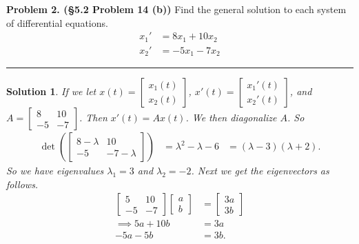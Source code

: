 \documentclass[leqno]{article}
\theoremstyle{nonumberplain}
\newtheorem{solution}{Solution}
\begin{document}


\noindent\textbf{Problem 2. (\S 5.2 Problem 14 (b))} Find the general solution to each system of differential equations.
\begin{align*}
x_1'&=8x_1+10x_2\\
x_2'&=-5x_1-7x_2
\end{align*}

\noindent\rule[0.5ex]{\linewidth}{1pt}

\begin{solution}
If we let $x(t)=\begin{bmatrix} x_1(t) \\ x_2(t) \end{bmatrix}$, $x'(t)=\begin{bmatrix} x_1'(t)\\ x_2'(t) \end{bmatrix}$, and $A=\begin{bmatrix} 8 & 10 \\ -5 & -7 \end{bmatrix}$. Then $x'(t)=Ax(t)$.  We then diagonalize $A$.  So
\begin{align*}
\det\left( \begin{bmatrix}
8-\lambda & 10\\
-5 & -7 - \lambda
\end{bmatrix}\right)&=
\lambda^2-\lambda-6&=(\lambda-3)(\lambda+2).
\end{align*}
So we have eigenvalues $\lambda_1=3$ and $\lambda_2=-2$.  Next we get the eigenvectors as follows.
\begin{align*}
\begin{bmatrix}
5 & 10\\
-5 & -7
\end{bmatrix}
\begin{bmatrix}
a\\
b
\end{bmatrix}
&=
\begin{bmatrix}
3a\\
3b
\end{bmatrix}\\
\implies 5a+10b&=3a\\
-5a-5b&=3b.
\end{align*}

\end{solution}
\end{document}
